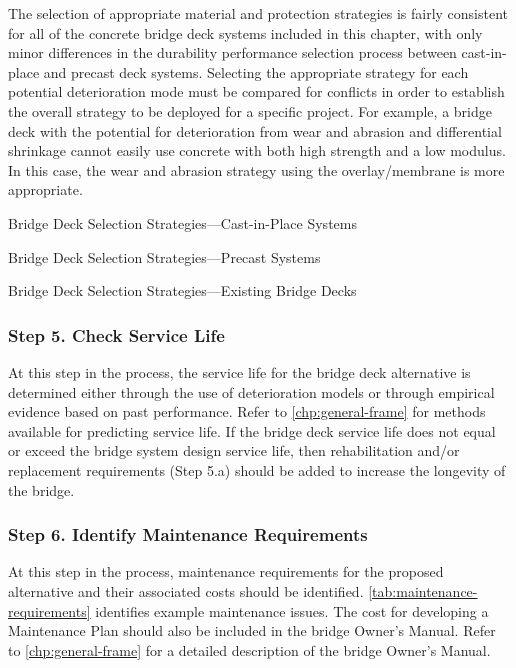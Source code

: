The selection of appropriate material and protection strategies is fairly consistent for all of the concrete bridge deck systems included in this chapter, with only minor differences in the durability performance selection process between cast-in-place and precast deck systems. Selecting the appropriate strategy for each potential deterioration mode must be compared for conflicts in order to establish the overall strategy to be deployed for a specific project. For example, a bridge deck with the potential for deterioration from wear and abrasion and differential shrinkage cannot easily use concrete with both high strength and a low modulus. In this case, the wear and abrasion strategy using the overlay/membrane is more appropriate.

\begin{table}
  \caption{Bridge Deck Selection Strategies—Cast-in-Place Systems}
  \label{tab:deck-select-stratergy-cip}
\end{table}

\begin{table}
  \caption{Bridge Deck Selection Strategies—Precast Systems}
  \label{tab:deck-select-stratergy-precast}
\end{table}

\begin{table}
  \caption{Bridge Deck Selection Strategies—Existing Bridge Decks}
  \label{tab:deck-select-stratergy-exist}
\end{table}


\subsubsection*{Step 5. Check Service Life}
At this step in the process, the service life for the bridge deck alternative is determined either through the use of deterioration models or through empirical evidence based on past performance. Refer to \cref{chp:general-frame} for methods available for predicting service life. If the bridge deck service life does not equal or exceed the bridge system design service life, then rehabilitation and/or replacement requirements (Step 5.a) should be added to increase the longevity of the bridge.

\subsubsection*{Step 6. Identify Maintenance Requirements}
At this step in the process, maintenance requirements for the proposed alternative and their associated costs should be identified. \cref{tab:maintenance-requirements} identifies example maintenance issues. The cost for developing a Maintenance Plan should also be included in the bridge Owner’s Manual. Refer to \cref{chp:general-frame} for a detailed description of the bridge Owner’s Manual.

